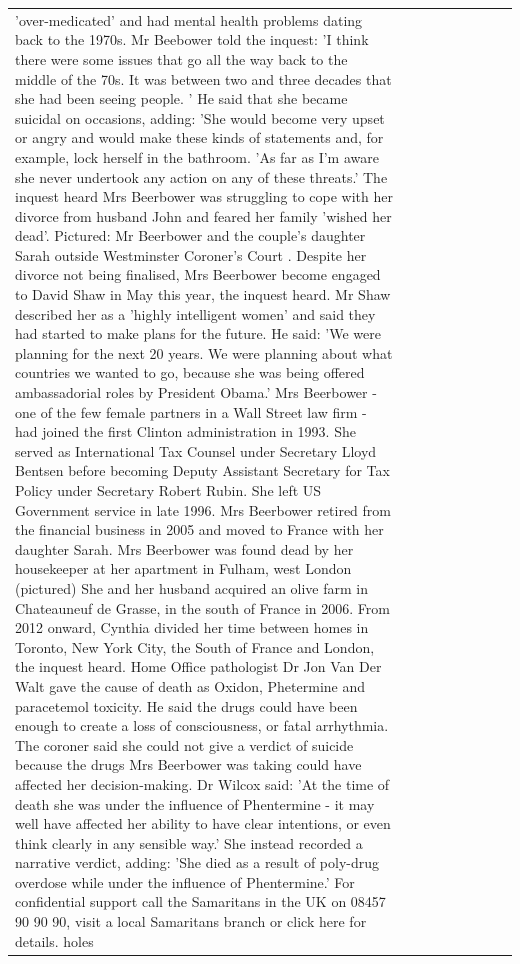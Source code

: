 \begin{table}[H]
\begin{tabular}{lllrlllll}
'over-medicated' and had mental health problems dating back to the 1970s. Mr Beebower told the inquest: 'I think there were some issues that go all the way back to the middle of the 70s. It was between two and three decades that she had been seeing people. ' He said that she became suicidal on occasions, adding: 'She would become very upset or angry and would make these kinds of statements and, for example, lock herself in the bathroom. 'As far as I'm aware she never undertook any action on any of these threats.' The inquest heard Mrs Beerbower was struggling to cope with her divorce from husband John and feared her family 'wished her dead'. Pictured: Mr Beerbower and the couple's daughter Sarah outside Westminster Coroner's Court . Despite her divorce not being finalised, Mrs Beerbower become engaged to David Shaw in May this year, the inquest heard. Mr Shaw described her as a 'highly intelligent women' and said they had started to make plans for the future. He said: 'We were planning for the next 20 years. We were planning about what countries we wanted to go, because she was being offered ambassadorial roles by President Obama.' Mrs Beerbower - one of the few female partners in a Wall Street law firm - had joined the first Clinton administration in 1993. She served as International Tax Counsel under Secretary Lloyd Bentsen before becoming Deputy Assistant Secretary for Tax Policy under Secretary Robert Rubin. She left US Government service in late 1996. Mrs Beerbower retired from the financial business in 2005 and moved to France with her daughter Sarah. Mrs Beerbower was found dead by her housekeeper at her apartment in Fulham, west London (pictured) She and her husband acquired an olive farm in Chateauneuf de Grasse, in the south of France in 2006. From 2012 onward, Cynthia divided her time between homes in Toronto, New York City, the South of France and London, the inquest heard. Home Office pathologist Dr Jon Van Der Walt gave the cause of death as Oxidon, Phetermine and paracetemol toxicity. He said the drugs could have been enough to create a loss of consciousness, or fatal arrhythmia. The coroner said she could not give a verdict of suicide because the drugs Mrs Beerbower was taking could have affected her decision-making. Dr Wilcox said: 'At the time of death she was under the influence of Phentermine - it may well have affected her ability to have clear intentions, or even think clearly in any sensible way.' She instead recorded a narrative verdict, adding: 'She died as a result of poly-drug overdose while under the influence of Phentermine.' For confidential support call the Samaritans in the UK on 08457 90 90 90, visit a local Samaritans branch or click here for details. holes \\

\end{tabular}
\end{table}
